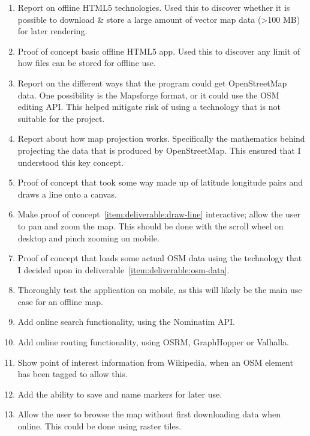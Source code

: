 \documentclass[hyphens]{final_report}
\begin{document}
\begin{enumerate}
    \item Report on offline HTML5 technologies. Used this to discover whether it is possible to download \& store a large amount of vector map data (>100 MB) for later rendering.\label{item:deliverable:offline-html}
    \item Proof of concept basic offline HTML5 app. Used this to discover any limit of how files can be stored for offline use.\label{item:deliverable:basic-offline-app}
    \item Report on the different ways  that the program could get OpenStreetMap data. One possibility is the Mapsforge format, or it could use the OSM editing API\@. This helped mitigate risk of using a technology that is not suitable for the project.\label{item:deliverable:osm-data}
    \item Report about how map projection works. Specifically the mathematics behind projecting the data that is produced by OpenStreetMap. This ensured that I understood this key concept.\label{item:deliverable:map-projection}
    \item Proof of concept that took some way made up of latitude longitude pairs and draws a line onto a canvas.\label{item:deliverable:draw-line}
    \item Make proof of concept~\ref{item:deliverable:draw-line} interactive; allow the user to pan and zoom the map. This should be done with the scroll wheel on desktop and pinch zooming on mobile.\label{item:deliverable:pan-zoom}
    \item Proof of concept that loads some actual OSM data using the technology that I decided upon in deliverable~\ref{item:deliverable:osm-data}.\label{item:deliverable:load-osm-data}
    \item Thoroughly test the application on mobile, as this will likely be the main use case for an offline map.\label{item:deliverable:mobile-testing}
    \item Add online search functionality, using the Nominatim API.\label{item:deliverable:search}
    \item Add online routing functionality, using OSRM, GraphHopper or Valhalla.\label{item:deliverable:routing}
    \item Show point of interest information from Wikipedia, when an OSM element has been tagged to allow this.\label{item:deliverable:wikipedia}
    \item Add the ability to save and name markers for later use.\label{item:deliverable:markers}
    \item Allow the user to browse the map without first downloading data when online. This could be done using raster tiles.\label{item:deliverable:online}
\end{enumerate}
\end{document}
